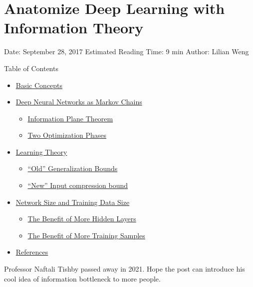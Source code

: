 \section{Anatomize Deep Learning with Information Theory}\label{anatomize-deep-learning-with-information-theory}

Date: September 28, 2017 \textbar{} Estimated Reading Time: 9 min \textbar{} Author: Lilian Weng

{Table of Contents}

\begin{itemize}
\tightlist
\item
  \hyperref[basic-concepts]{Basic Concepts}
\item
  \hyperref[deep-neural-networks-as-markov-chains]{Deep Neural Networks as Markov Chains}

  \begin{itemize}
  \tightlist
  \item
    \hyperref[information-plane-theorem]{Information Plane Theorem}
  \item
    \hyperref[two-optimization-phases]{Two Optimization Phases}
  \end{itemize}
\item
  \hyperref[learning-theory]{Learning Theory}

  \begin{itemize}
  \tightlist
  \item
    \hyperref[old-generalization-bounds]{``Old'' Generalization Bounds}
  \item
    \hyperref[new-input-compression-bound]{``New'' Input compression bound}
  \end{itemize}
\item
  \hyperref[network-size-and-training-data-size]{Network Size and Training Data Size}

  \begin{itemize}
  \tightlist
  \item
    \hyperref[the-benefit-of-more-hidden-layers]{The Benefit of More Hidden Layers}
  \item
    \hyperref[the-benefit-of-more-training-samples]{The Benefit of More Training Samples}
  \end{itemize}
\item
  \hyperref[references]{References}
\end{itemize}

{Professor Naftali Tishby passed away in 2021. Hope the post can introduce his cool idea of information bottleneck to more people.}

